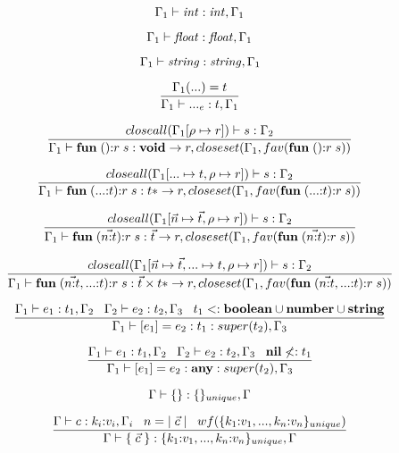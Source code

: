 \[
\Gamma_{1} \vdash {\it int}:{\it int}, \Gamma_{1}
\]

\[
\Gamma_{1} \vdash {\it float}:{\it float}, \Gamma_{1}
\]

\[
\Gamma_{1} \vdash {\it string}:{\it string}, \Gamma_{1}
\]

\[
\dfrac{\Gamma_{1}({...}) = t}
      {\Gamma_{1} \vdash {...}_{e}:t, \Gamma_{1}}
\]

\[
\dfrac{closeall(\Gamma_{1}[\rho \mapsto r]) \vdash s:\Gamma_{2}}
      {\Gamma_{1} \vdash \mathbf{fun} \; (){:}r \; s:\mathbf{void} \rightarrow r, closeset(\Gamma_{1}, fav(\mathbf{fun} \; (){:}r \; s))}
\]

\[
\dfrac{closeall(\Gamma_{1}[{...} \mapsto t, \rho \mapsto r]) \vdash s:\Gamma_{2}}
      {\Gamma_{1} \vdash \mathbf{fun} \; ({...}{:}t){:}r \; s:t{*} \rightarrow r, closeset(\Gamma_{1}, fav(\mathbf{fun} \; ({...}{:}t){:}r \; s))}
\]

\[
\dfrac{closeall(\Gamma_{1}[\vec{n} \mapsto \vec{t}, \rho \mapsto r]) \vdash s:\Gamma_{2}}
      {\Gamma_{1} \vdash \mathbf{fun} \; (\vec{n{:}t}){:}r \; s:\vec{t} \rightarrow r, closeset(\Gamma_{1}, fav(\mathbf{fun} \; (\vec{n{:}t}){:}r \; s))}
\]

\[
\dfrac{closeall(\Gamma_{1}[\vec{n} \mapsto \vec{t}, {...} \mapsto t, \rho \mapsto r]) \vdash s:\Gamma_{2}}
      {\Gamma_{1} \vdash \mathbf{fun} \; (\vec{n{:}t},{...}{:}t){:}r \; s: \vec{t} \times t{*} \rightarrow r, closeset(\Gamma_{1}, fav(\mathbf{fun} \; (\vec{n{:}t},{...}{:}t){:}r \; s))}
\]

\[
\dfrac{\Gamma_{1} \vdash e_{1}:t_{1}, \Gamma_{2} \;\;\;
       \Gamma_{2} \vdash e_{2}:t_{2}, \Gamma_{3} \;\;\;
       t_{1} <: \mathbf{boolean} \cup \mathbf{number} \cup \mathbf{string}}
      {\Gamma_{1} \vdash [e_{1}] = e_{2}: t_{1}:super(t_{2}), \Gamma_{3}}
\]

\[
\dfrac{\Gamma_{1} \vdash e_{1}:t_{1}, \Gamma_{2} \;\;\;
       \Gamma_{2} \vdash e_{2}:t_{2}, \Gamma_{3} \;\;\;
       \mathbf{nil} \not<: t_{1}}
      {\Gamma_{1} \vdash [e_{1}] = e_{2}: \mathbf{any}:super(t_{2}), \Gamma_{3}}
\]

\[
\Gamma \vdash \{\}:\{\}_{unique}, \Gamma
\]

\[
\dfrac{\Gamma \vdash c:k_{i}{:}v_{i}, \Gamma_{i} \;\;\;
       n = |\;\vec{c}\;| \;\;\;
       wf(\{k_{1}{:}v_{1}, ..., k_{n}{:}v_{n}\}_{unique})}
      {\Gamma \vdash \{\;\vec{c}\;\}:\{k_{1}{:}v_{1}, ..., k_{n}{:}v_{n}\}_{unique}, \Gamma}
\]

